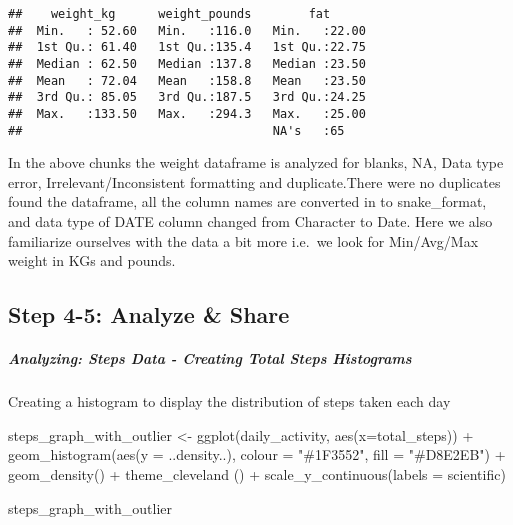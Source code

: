 \documentclass[
]{article}
\newenvironment{Shaded}{\begin{snugshade}}{\end{snugshade}}
\newcommand{\AttributeTok}[1]{\textcolor[rgb]{0.77,0.63,0.00}{#1}}
\newcommand{\FunctionTok}[1]{\textcolor[rgb]{0.00,0.00,0.00}{#1}}
\newcommand{\NormalTok}[1]{#1}
\newcommand{\OtherTok}[1]{\textcolor[rgb]{0.56,0.35,0.01}{#1}}
\newcommand{\SpecialCharTok}[1]{\textcolor[rgb]{0.00,0.00,0.00}{#1}}
\newcommand{\StringTok}[1]{\textcolor[rgb]{0.31,0.60,0.02}{#1}}
\begin{document}
\begin{verbatim}
##    weight_kg      weight_pounds        fat       
##  Min.   : 52.60   Min.   :116.0   Min.   :22.00  
##  1st Qu.: 61.40   1st Qu.:135.4   1st Qu.:22.75  
##  Median : 62.50   Median :137.8   Median :23.50  
##  Mean   : 72.04   Mean   :158.8   Mean   :23.50  
##  3rd Qu.: 85.05   3rd Qu.:187.5   3rd Qu.:24.25  
##  Max.   :133.50   Max.   :294.3   Max.   :25.00  
##                                   NA's   :65
\end{verbatim}

In the above chunks the weight dataframe is analyzed for blanks, NA,
Data type error, Irrelevant/Inconsistent formatting and duplicate.There
were no duplicates found the dataframe, all the column names are
converted in to snake\_format, and data type of DATE column changed from
Character to Date. Here we also familiarize ourselves with the data a
bit more i.e.~we look for Min/Avg/Max weight in KGs and pounds.

\hypertarget{step-4-5-analyze-share}{%
\subsection{Step 4-5: Analyze \& Share}\label{step-4-5-analyze-share}}

\hypertarget{analyzing-steps-data---creating-total-steps-histograms}{%
\subparagraph{\texorpdfstring{\textbf{Analyzing: Steps Data - Creating
Total Steps
Histograms}}{Analyzing: Steps Data - Creating Total Steps Histograms}}\label{analyzing-steps-data---creating-total-steps-histograms}}

Creating a histogram to display the distribution of steps taken each day

\begin{Shaded}
\begin{Highlighting}[]
\NormalTok{steps\_graph\_with\_outlier }\OtherTok{\textless{}{-}} \FunctionTok{ggplot}\NormalTok{(daily\_activity, }\FunctionTok{aes}\NormalTok{(}\AttributeTok{x=}\NormalTok{total\_steps)) }\SpecialCharTok{+} 
      \FunctionTok{geom\_histogram}\NormalTok{(}\FunctionTok{aes}\NormalTok{(}\AttributeTok{y =}\NormalTok{ ..density..), }\AttributeTok{colour =} \StringTok{"\#1F3552"}\NormalTok{, }\AttributeTok{fill =} \StringTok{"\#D8E2EB"}\NormalTok{) }\SpecialCharTok{+} 
      \FunctionTok{geom\_density}\NormalTok{() }\SpecialCharTok{+}
      \FunctionTok{theme\_cleveland}\NormalTok{ () }\SpecialCharTok{+}
      \FunctionTok{scale\_y\_continuous}\NormalTok{(}\AttributeTok{labels =}\NormalTok{ scientific)}

\NormalTok{steps\_graph\_with\_outlier}
\end{Highlighting}
\end{Shaded}
\end{document}
